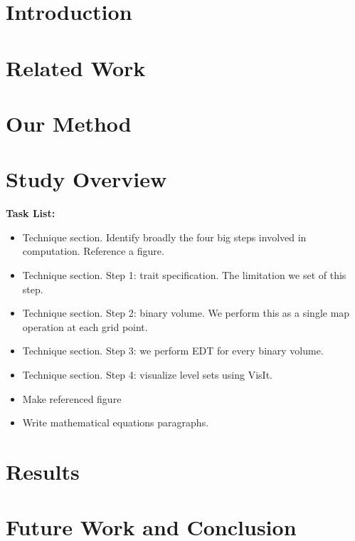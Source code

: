 \section{Introduction}
\label{sec:introduction}


\section{Related Work}
\label{sec:related}


\section{Our Method}
\label{sec:method}


\section{Study Overview}
\textbf{Task List:}
\begin{itemize}
\item Technique section. Identify broadly the four big steps involved in computation. Reference a figure.
\item Technique section. Step 1: trait specification. The limitation we set of this step. 
\item Technique section. Step 2: binary volume. We perform this as a single map operation at each grid point.
\item Technique section. Step 3: we perform EDT for every binary volume.
\item Technique section. Step 4: visualize level sets using VisIt.
\item Make referenced figure
\item Write mathematical equations paragraphs.
\end{itemize}

\label{sec:study}


\section{Results}
\label{sec:results}


\section{Future Work and Conclusion}
\label{sec:conclusion}

